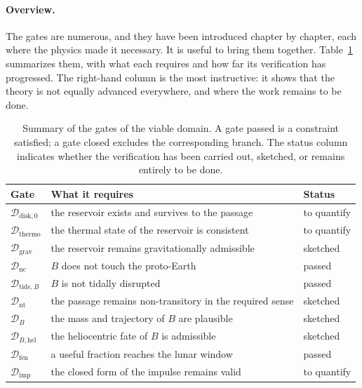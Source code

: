 \documentclass[11pt,a4paper,openany]{report}
\begin{document}
\paragraph{Overview.} The gates are numerous, and they have been introduced chapter by chapter,
each where the physics made it necessary. It is useful to bring them together.
Table~\ref{tab:portes} summarizes them, with what each requires and how far its verification has
progressed. The right-hand column is the most instructive: it shows that the theory is not equally
advanced everywhere, and where the work remains to be done.

\begin{table}[htbp]
\centering
\small
\caption{Summary of the gates of the viable domain. A gate passed is a constraint satisfied; a gate
closed excludes the corresponding branch. The status column indicates whether the verification has
been carried out, sketched, or remains entirely to be done.}
\label{tab:portes}
\begin{tabularx}{\textwidth}{>{\raggedright\arraybackslash}p{2.6cm}
>{\raggedright\arraybackslash}X >{\raggedright\arraybackslash}p{2.6cm}}
\toprule
\textbf{Gate} & \textbf{What it requires} & \textbf{Status} \\
\midrule
$\mathcal{D}_{\mathrm{disk},0}$ & the reservoir exists and survives to the passage & to quantify \\
$\mathcal{D}_{\mathrm{thermo}}$ & the thermal state of the reservoir is consistent & to quantify \\
$\mathcal{D}_{\mathrm{grav}}$ & the reservoir remains gravitationally admissible & sketched \\
\midrule
$\mathcal{D}_{\mathrm{nc}}$ & $B$ does not touch the proto-Earth & passed \\
$\mathcal{D}_{\mathrm{tide},B}$ & $B$ is not tidally disrupted & passed \\
$\mathcal{D}_{\mathrm{nt}}$ & the passage remains non-transitory in the required sense & sketched \\
$\mathcal{D}_{B}$ & the mass and trajectory of $B$ are plausible & sketched \\
$\mathcal{D}_{B,\mathrm{hel}}$ & the heliocentric fate of $B$ is admissible & sketched \\
\midrule
$\mathcal{D}_{\mathrm{fen}}$ & a useful fraction reaches the lunar window & passed \\
$\mathcal{D}_{\mathrm{imp}}$ & the closed form of the impulse remains valid & to quantify \\

\end{tabularx}
\end{table}
\end{document}
